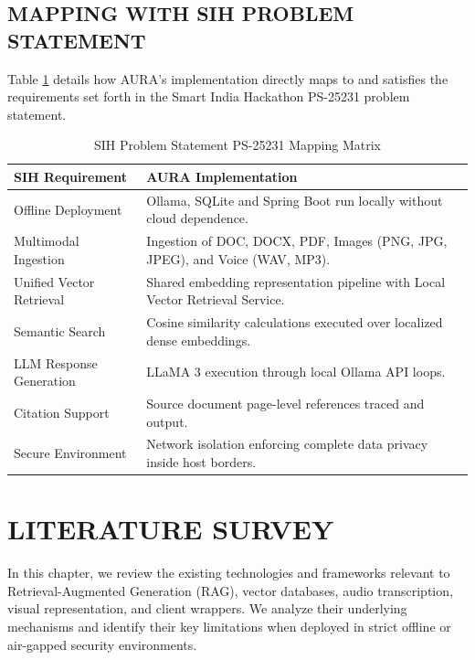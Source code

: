 \documentclass[12pt,a4paper]{report}
\begin{document}
\section{MAPPING WITH SIH PROBLEM STATEMENT}
Table \ref{tab:sih_mapping} details how AURA's implementation directly maps to and satisfies the requirements set forth in the Smart India Hackathon PS-25231 problem statement.

\begin{table}[!ht]
\centering
\small
\begin{tabularx}{\textwidth}{|>{\hsize=0.6\hsize}X | >{\hsize=1.4\hsize}X|}
\hline
\textbf{SIH Requirement} & \textbf{AURA Implementation} \\ \hline
Offline Deployment & Ollama, SQLite and Spring Boot run locally without cloud dependence. \\ \hline
Multimodal Ingestion & Ingestion of DOC, DOCX, PDF, Images (PNG, JPG, JPEG), and Voice (WAV, MP3). \\ \hline
Unified Vector Retrieval & Shared embedding representation pipeline with Local Vector Retrieval Service. \\ \hline
Semantic Search & Cosine similarity calculations executed over localized dense embeddings. \\ \hline
LLM Response Generation & LLaMA 3 execution through local Ollama API loops. \\ \hline
Citation Support & Source document page-level references traced and output. \\ \hline
Secure Environment & Network isolation enforcing complete data privacy inside host borders. \\ \hline
\end{tabularx}
\caption{SIH Problem Statement PS-25231 Mapping Matrix}
\label{tab:sih_mapping}
\end{table}

\chapter{LITERATURE SURVEY}
\label{ch:literature_survey}

In this chapter, we review the existing technologies and frameworks relevant to Retrieval-Augmented Generation (RAG), vector databases, audio transcription, visual representation, and client wrappers. We analyze their underlying mechanisms and identify their key limitations when deployed in strict offline or air-gapped security environments.
\end{document}
